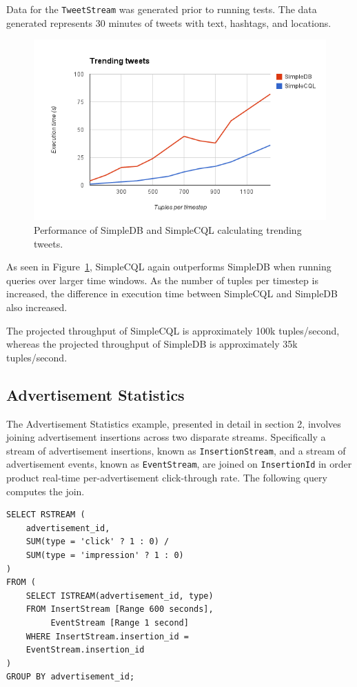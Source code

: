 \documentclass[a4paper, 10pt, conference]{IEEEconf}
\begin{document}
Data for the \texttt{TweetStream} was generated prior to running tests.  The data generated represents 30 minutes of tweets with text, hashtags, and locations.   

\begin{figure}[h!]
    \centering
    \centerline{\includegraphics[totalheight=5cm]{trending.png}}
    \caption{Performance of SimpleDB and SimpleCQL calculating trending tweets.}
    \label{fig:trending}
\end{figure}

As seen in Figure~\ref{fig:trending}, SimpleCQL again outperforms SimpleDB when running queries over larger time windows.  As the number of tuples per timestep is increased, the difference in execution time between SimpleCQL and SimpleDB also increased.

The projected throughput of SimpleCQL is approximately 100k tuples/second, whereas the projected throughput of SimpleDB is approximately 35k tuples/second.

\subsection{Advertisement Statistics}
The Advertisement Statistics example, presented in detail in section 2, involves joining advertisement insertions across two disparate streams.  Specifically a stream of advertisement insertions, known as \texttt{InsertionStream}, and a stream of advertisement events, known as \texttt{EventStream}, are joined on \texttt{InsertionId} in order product real-time per-advertisement click-through rate.  The following query computes the join.

\begin{lstlisting}
SELECT RSTREAM (
    advertisement_id,
    SUM(type = 'click' ? 1 : 0) / 
    SUM(type = 'impression' ? 1 : 0)
)
FROM (
    SELECT ISTREAM(advertisement_id, type)
    FROM InsertStream [Range 600 seconds], 
         EventStream [Range 1 second] 
    WHERE InsertStream.insertion_id = 
    EventStream.insertion_id
) 
GROUP BY advertisement_id;
\end{lstlisting}
\end{document}
